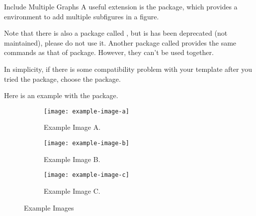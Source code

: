\begin{frame}[fragile]{Include Multiple Graphs}
    A useful extension is the  package, which provides a  environment to add multiple subfigures in a figure. \medskip
    
    Note that there is also a package called , but is has been deprecated (not maintained), please do not use it. Another package called  provides the same commands as that of  package. However, they can't be used together. \medskip
    
    In simplicity, if there is some compatibility problem with your template after you tried the  package, choose the  package. \medskip
    
    Here is an example with the  package.
\end{frame}

\begin{latexexampleframe}
\begin{figure}
    \centering
    \begin{subfigure}{0.3\textwidth}
        \texttt{[image: example-image-a]}
        \caption{Example Image A.}
        \label{fig:subcaption-a}
    \end{subfigure}
    \begin{subfigure}{0.3\textwidth}
        \texttt{[image: example-image-b]}
        \caption{Example Image B.}
        \label{fig:subcaption-b}
    \end{subfigure}

    \begin{subfigure}{0.3\textwidth}
        \texttt{[image: example-image-c]}
        \caption{Example Image C.}
        \label{fig:subcaption-c}
    \end{subfigure}
    \caption{Example Images}\label{fig:subcaption}
\end{figure}
\end{latexexampleframe}

